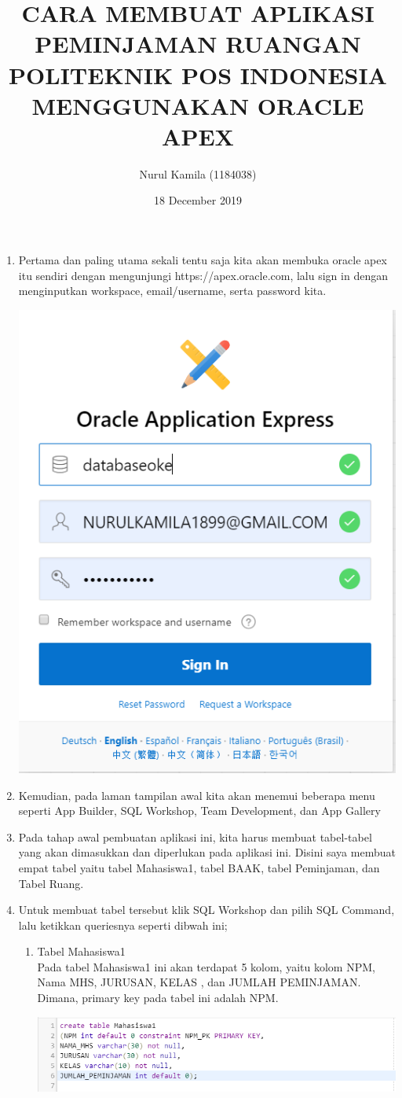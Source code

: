 \documentclass{article}
\title{CARA MEMBUAT APLIKASI PEMINJAMAN RUANGAN POLITEKNIK POS INDONESIA MENGGUNAKAN ORACLE APEX}
\author{Nurul Kamila (1184038) }
\date{18 December 2019}
\begin{document}
\maketitle
\begin{enumerate}
    \item 	Pertama dan paling utama sekali tentu saja kita akan membuka oracle apex itu sendiri dengan mengunjungi https://apex.oracle.com, lalu sign in dengan menginputkan workspace, email/username, serta password kita.
    \begin{center}
    \includegraphics[width=.6\textwidth]{Figure/14.PNG}
    \end{center}
    
    \item   Kemudian, pada laman tampilan awal kita akan menemui beberapa menu seperti App Builder, SQL Workshop, Team Development, dan App Gallery
    
    \item   Pada tahap awal pembuatan aplikasi ini, kita harus membuat tabel-tabel yang akan dimasukkan dan diperlukan pada aplikasi ini. Disini saya membuat empat tabel yaitu tabel Mahasiswa1, tabel BAAK, tabel Peminjaman, dan Tabel Ruang.
    
    \item   Untuk membuat tabel tersebut klik SQL Workshop dan pilih SQL Command, lalu ketikkan queriesnya seperti dibwah ini;
     \begin{enumerate}
         \item  Tabel Mahasiswa1\\
         Pada tabel Mahasiswa1 ini akan terdapat 5 kolom, yaitu kolom NPM, Nama MHS, JURUSAN, KELAS , dan JUMLAH PEMINJAMAN. Dimana, primary key pada tabel ini adalah NPM.
         \begin{center}
         \includegraphics[width=.8\textwidth]{Figure/q1.PNG}
         \end{center}
         

\end{enumerate}
\end{enumerate}
\end{document}
